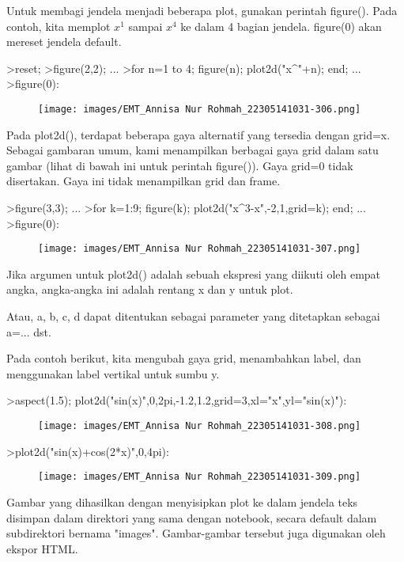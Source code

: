 \documentclass[a4paper,10pt]{article}
\begin{document}
\begin{eulernotebook}
\begin{eulercomment}
Untuk membagi jendela menjadi beberapa plot, gunakan perintah
figure(). Pada contoh, kita memplot $x^1$ sampai $x^4$ ke dalam 4 bagian
jendela. figure(0) akan mereset jendela default.
\end{eulercomment}
\begin{eulerprompt}
>reset;
>figure(2,2); ...
>for n=1 to 4; figure(n); plot2d("x^"+n); end; ...
>figure(0):
\end{eulerprompt}
\begin{figure}[h]
    \centering
    \texttt{[image: images/EMT\_Annisa Nur Rohmah\_22305141031-306.png]}
\end{figure}
\begin{eulercomment}
Pada plot2d(), terdapat beberapa gaya alternatif yang tersedia dengan
grid=x. Sebagai gambaran umum, kami menampilkan berbagai gaya grid
dalam satu gambar (lihat di bawah ini untuk perintah figure()). Gaya
grid=0 tidak disertakan. Gaya ini tidak menampilkan grid dan frame.
\end{eulercomment}
\begin{eulerprompt}
>figure(3,3); ...
>for k=1:9; figure(k); plot2d("x^3-x",-2,1,grid=k); end; ...
>figure(0):
\end{eulerprompt}
\begin{figure}[h]
    \centering
    \texttt{[image: images/EMT\_Annisa Nur Rohmah\_22305141031-307.png]}
\end{figure}
\begin{eulercomment}
Jika argumen untuk plot2d() adalah sebuah ekspresi yang diikuti oleh
empat angka, angka-angka ini adalah rentang x dan y untuk plot.

Atau, a, b, c, d dapat ditentukan sebagai parameter yang ditetapkan
sebagai a=... dst.

Pada contoh berikut, kita mengubah gaya grid, menambahkan label, dan
menggunakan label vertikal untuk sumbu y.
\end{eulercomment}
\begin{eulerprompt}
>aspect(1.5); plot2d("sin(x)",0,2pi,-1.2,1.2,grid=3,xl="x",yl="sin(x)"):
\end{eulerprompt}
\begin{figure}[h]
    \centering
    \texttt{[image: images/EMT\_Annisa Nur Rohmah\_22305141031-308.png]}
\end{figure}
\begin{eulerprompt}
>plot2d("sin(x)+cos(2*x)",0,4pi):
\end{eulerprompt}
\begin{figure}[h]
    \centering
    \texttt{[image: images/EMT\_Annisa Nur Rohmah\_22305141031-309.png]}
\end{figure}
\begin{eulercomment}
Gambar yang dihasilkan dengan menyisipkan plot ke dalam jendela teks
disimpan dalam direktori yang sama dengan notebook, secara default
dalam subdirektori bernama "images". Gambar-gambar tersebut juga
digunakan oleh ekspor HTML.


\end{eulercomment}
\end{eulernotebook}
\end{document}
